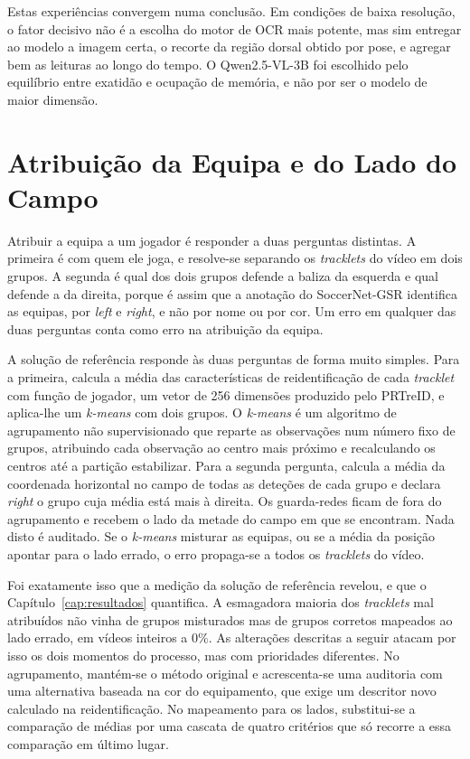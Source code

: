 Estas experiências convergem numa conclusão. Em condições de baixa resolução, o fator decisivo não é
a escolha do motor de OCR mais potente, mas sim entregar ao modelo a imagem certa, o recorte da
região dorsal obtido por pose, e agregar bem as leituras ao longo do tempo. O Qwen2.5-VL-3B foi
escolhido pelo equilíbrio entre exatidão e ocupação de memória, e não por ser o modelo de maior
dimensão.

\section{Atribuição da Equipa e do Lado do Campo}\label{sec:met-equipa}

Atribuir a equipa a um jogador é responder a duas perguntas distintas. A primeira é com quem
ele joga, e resolve-se separando os \emph{tracklets} do vídeo em dois grupos. A segunda é qual
dos dois grupos defende a baliza da esquerda e qual defende a da direita, porque é assim que a
anotação do SoccerNet-GSR identifica as equipas, por \emph{left} e \emph{right}, e não por
nome ou por cor. Um erro em qualquer das duas perguntas conta como erro na atribuição da equipa.

A solução de referência responde às duas perguntas de forma muito simples. Para a primeira,
calcula a média das características de reidentificação de cada \emph{tracklet} com função de
jogador, um vetor de 256 dimensões produzido pelo PRTreID, e aplica-lhe um \emph{k-means} com
dois grupos. O \emph{k-means} é um algoritmo de agrupamento não supervisionado que reparte as
observações num número fixo de grupos, atribuindo cada observação ao centro mais próximo e
recalculando os centros até a partição estabilizar. Para a segunda pergunta, calcula a média da
coordenada horizontal no campo de todas as deteções de cada grupo e declara \emph{right} o grupo
cuja média está mais à direita. Os guarda-redes ficam de fora do agrupamento e recebem o lado
da metade do campo em que se encontram. Nada disto é auditado. Se o \emph{k-means} misturar as
equipas, ou se a média da posição apontar para o lado errado, o erro propaga-se a todos os
\emph{tracklets} do vídeo.

Foi exatamente isso que a medição da solução de referência revelou, e que o Capítulo~\ref{cap:resultados}
quantifica. A esmagadora maioria dos \emph{tracklets} mal atribuídos não vinha de grupos
misturados mas de grupos corretos mapeados ao lado errado, em vídeos inteiros a $0\%$. As
alterações descritas a seguir atacam por isso os dois momentos do processo, mas com prioridades
diferentes. No agrupamento, mantém-se o método original e acrescenta-se uma auditoria com uma
alternativa baseada na cor do equipamento, que exige um descritor novo calculado na
reidentificação. No mapeamento para os lados, substitui-se a comparação de médias por uma cascata
de quatro critérios que só recorre a essa comparação em último lugar.

